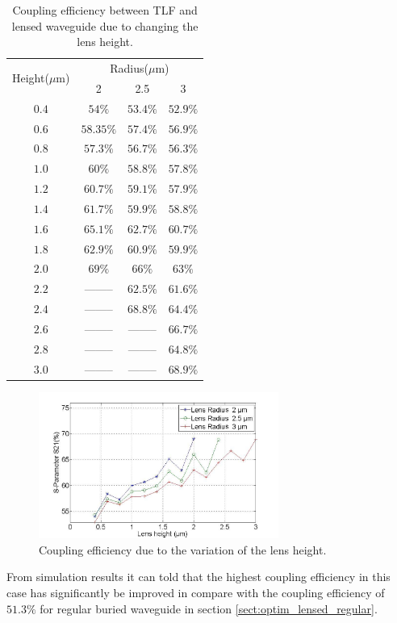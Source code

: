 \begin{table}[!ht]
\caption{Coupling efficiency between TLF and lensed waveguide due to changing the lens height.}
\centering
\begin{tabular}{|c|c|c|c|}
\hline
\multirow{2}{*}{Height($\mu$m)}&\multicolumn{3}{c|}{Radius($\mu$m)}\\
\cline{2-4}
 			&	2&	2.5&	3\\
\hline
$0.4$&$54\%$&$53.4\%$&$52.9\%$\\
$0.6$&$58.35\%$&$57.4\%$&$56.9\%$\\
$0.8$&$57.3\%$&$56.7\%$&$56.3\%$\\
$1.0$&$60\%$&$58.8\%$&$57.8\%$\\
$1.2$&$60.7\%$&$59.1\%$&$57.9\%$\\
$1.4$&$61.7\%$&$59.9\%$&$58.8\%$\\
$1.6$&$65.1\%$&$62.7\%$&$60.7\%$\\
$1.8$&$62.9\%$&$60.9\%$&$59.9\%$\\
$2.0$&$69\%$  &  $66\%$&$63\%$\\
$2.2$&--------&$62.5\%$&$61.6\%$\\
$2.4$&--------&$68.8\%$&$64.4\%$\\
$2.6$&--------&--------&$66.7\%$\\
$2.8$&--------&--------&$64.8\%$\\
$3.0$&--------&--------&$68.9\%$\\
\hline
\end{tabular}
\label{tab:coupling_lensed_waveguide_height}
\end{table}
\begin{figure}[!ht]
\centering
\includegraphics[width=0.7\textwidth]{bilder/s21_fix_lens_radium_hxx}
\caption{Coupling efficiency due to the variation of the lens height.}
\label{fig:coupling_lenses_curve_hxx}
\end{figure}
From simulation results it can told that the highest coupling efficiency in this case has significantly be improved in compare with the coupling efficiency of $51.3\%$ for regular buried waveguide in section \ref{sect:optim_lensed_regular}.\\

